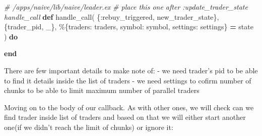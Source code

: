 \documentclass[
]{book}
\newenvironment{Shaded}{\begin{snugshade}}{\end{snugshade}}
\newcommand{\CommentTok}[1]{\textcolor[rgb]{0.56,0.35,0.01}{\textit{#1}}}
\newcommand{\KeywordTok}[1]{\textcolor[rgb]{0.13,0.29,0.53}{\textbf{#1}}}
\newcommand{\NormalTok}[1]{#1}
\newcommand{\OperatorTok}[1]{\textcolor[rgb]{0.81,0.36,0.00}{\textbf{#1}}}
\newcommand{\VariableTok}[1]{\textcolor[rgb]{0.00,0.00,0.00}{#1}}
\begin{document}
\begin{Shaded}
\begin{Highlighting}[]
  \CommentTok{\# /apps/naive/lib/naive/leader.ex}
  \CommentTok{\# place this one after :update\_trader\_state handle\_call}
  \KeywordTok{def}\NormalTok{ handle\_call(}
\NormalTok{        \{}\VariableTok{:rebuy\_triggered}\NormalTok{, new\_trader\_state\},}
\NormalTok{        \{trader\_pid, \_\},}
\NormalTok{        \%\{}\VariableTok{traders:}\NormalTok{ traders, }\VariableTok{symbol:}\NormalTok{ symbol, }\VariableTok{settings:}\NormalTok{ settings\} }\OperatorTok{=}\NormalTok{ state}
\NormalTok{      ) }\KeywordTok{do}

  \KeywordTok{end}
\end{Highlighting}
\end{Shaded}

There are few important details to make note of:
- we need trader's pid to be able to find it details inside the list of traders
- we need settings to cofirm number of chunks to be able to limit maximum number of parallel traders

Moving on to the body of our callback. As with other ones, we will check can we find trader inside list of traders and based on that we will either start another one(if we didn't reach the limit of chunks) or ignore it:
\end{document}
